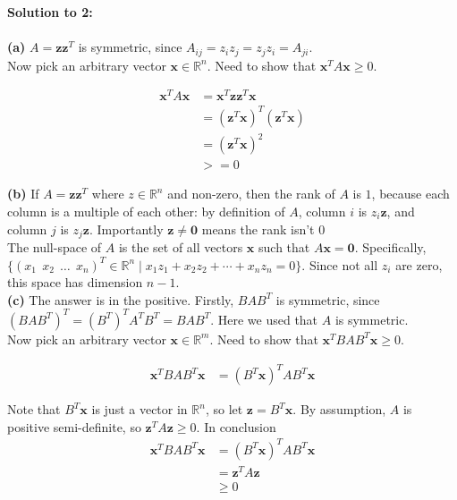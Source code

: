 \documentclass{article}
\begin{document}
\clearpage

\textbf{Solution to 2:}
\\
\\
\textbf{(a)} $A = \mathbf{z}\mathbf{z}^T$ is symmetric, since $A_{ij} = z_i z_j = z_j z_i = A_{ji}$.\\

Now pick an arbitrary vector $\mathbf{x} \in \mathbb{R}^n$. Need to show that
$\mathbf{x}^T A \mathbf{x} \geq 0$. 

\begin{align*}
\mathbf{x}^T A \mathbf{x} 
&= \mathbf{x}^T \mathbf{z} \mathbf{z}^T \mathbf{x} \\
&= (\mathbf{z}^T \mathbf{x})^T (\mathbf{z}^T \mathbf{x}) \\
&= (\mathbf{z}^T \mathbf{x})^2 \\
&>= 0
\end{align*}

\textbf{(b)} If $A = \mathbf{z}\mathbf{z}^T$ where $z \in \mathbb{R}^n$ and non-zero, then the
rank of $A$ is $1$, because each column is a multiple of each other: by definition of $A$, 
column $i$ is $z_i \mathbf{z}$, and column $j$ is $z_j \mathbf{z}$. Importantly $\mathbf{z} \neq 
\mathbf{0}$ means the rank isn't $0$\\

The null-space of $A$ is the set of all vectors $\mathbf{x}$ such that $A\mathbf{x} = \mathbf{0}$.
Specifically, $\{(x_1 \ \ x_2 \ \ \dots \ \ x_n)^T \in \mathbb{R}^n 
\mid x_1z_1 + x_2z_2 + \cdots + x_nz_n = 0\}$. Since not all $z_i$ are zero, this space has 
dimension $n-1$.\\

\textbf{(c)} The answer is in the positive. Firstly, $BAB^T$ is symmetric, 
since $(BAB^T)^T = (B^T)^T A^T B^T = B A B^T$. Here 
we used that $A$ is symmetric.\\

Now pick an arbitrary vector $\mathbf{x} \in \mathbb{R}^m$. Need to show that
$\mathbf{x}^T BAB^T \mathbf{x} \geq 0$.

\begin{align*}
\mathbf{x}^T BAB^T \mathbf{x}
&= (B^T \mathbf{x})^T A B^T \mathbf{x} 
\end{align*}

Note that $B^T \mathbf{x}$ is just a vector in $\mathbb{R}^n$, so let $\mathbf{z} = B^T \mathbf{x}$.
By assumption, $A$ is positive semi-definite, so $\mathbf{z}^T A \mathbf{z} \geq 0$. In conclusion
\begin{align*}
\mathbf{x}^T BAB^T \mathbf{x}
&= (B^T \mathbf{x})^T A B^T \mathbf{x} \\
&= \mathbf{z}^T A \mathbf{z} \\
&\geq 0
\end{align*}
\end{document}
